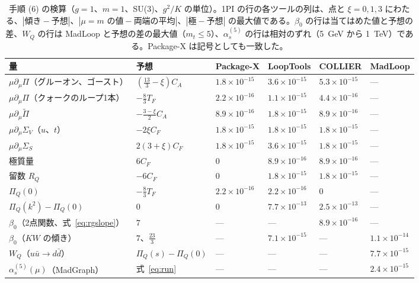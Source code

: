 \documentclass[a4paper,10pt]{ltjsarticle}
\begin{document}
\begin{table}[tbp]
\centering\small
\caption{手順 (6) の検算（$g=1$、$m=1$、SU(3)、$g^2/K$ の単位）。1PI の行の各ツールの列は、点と $\xi=0,1,3$ にわたる、$|\mbox{傾き}-\mbox{予想}|$、$|\mu=m\mbox{ の値}-\mbox{両端の平均}|$、$|\mbox{極}-\mbox{予想}|$ の最大値である。$\beta_0$ の行は当てはめた値と予想の差、$W_Q$ の行は MadLoop と予想の差の最大値（$m_t\le5$）、$\alpha_s^{(5)}$ の行は相対のずれ（5~GeV から 1~TeV）である。Package-X は記号としても一致した。}
\label{tab:rg}
\begin{tabular}{llllll}
\toprule
量 & 予想 & Package-X & LoopTools & COLLIER & MadLoop \\
\midrule
$\mu\partial_\mu\Pi$（グルーオン、ゴースト） & $(\frac{13}3-\xi)C_A$ & $1.8\times10^{-15}$ & $3.6\times10^{-15}$ & $5.3\times10^{-15}$ & — \\
$\mu\partial_\mu\Pi$（クォークのループ1本） & $-\frac83T_F$ & $2.2\times10^{-16}$ & $1.1\times10^{-15}$ & $4.4\times10^{-16}$ & — \\
$\mu\partial_\mu\tilde\Pi$ & $-\frac{3-\xi}2C_A$ & $8.9\times10^{-16}$ & $1.8\times10^{-15}$ & $8.9\times10^{-16}$ & — \\
$\mu\partial_\mu\Sigma_V$（$u$、$t$） & $-2\xi C_F$ & $1.8\times10^{-15}$ & $1.8\times10^{-15}$ & $1.8\times10^{-15}$ & — \\
$\mu\partial_\mu\Sigma_S$ & $2(3+\xi)C_F$ & $1.8\times10^{-15}$ & $3.6\times10^{-15}$ & $1.8\times10^{-15}$ & — \\
極質量 & $6C_F$ & $0$ & $8.9\times10^{-16}$ & $8.9\times10^{-16}$ & — \\
留数 $R_Q$ & $-6C_F$ & $0$ & $1.8\times10^{-15}$ & $1.8\times10^{-15}$ & — \\
$\Pi_Q(0)$ & $-\frac83T_F$ & $2.2\times10^{-16}$ & $2.2\times10^{-16}$ & $0$ & — \\
$\Pi_Q(k^2)-\Pi_Q(0)$ & $0$ & $0$ & $7.7\times10^{-13}$ & $2.5\times10^{-13}$ & — \\
$\beta_0$（2点関数、式~\eqref{eq:rgslope}） & $7$ & — & — & $8.9\times10^{-16}$ & — \\
$\beta_0$（$KW$ の傾き） & $7$、$\frac{23}3$ & — & $7.1\times10^{-15}$ & — & $1.1\times10^{-14}$ \\
$W_Q$（$u\bar u\to d\bar d$） & $\Pi_Q(s)-\Pi_Q(0)$ & — & — & — & $7.7\times10^{-15}$ \\
$\alpha_s^{(5)}(\mu)$（MadGraph） & 式~\eqref{eq:run} & — & — & — & $2.4\times10^{-15}$ \\
\bottomrule
\end{tabular}
\end{table}
\end{document}
